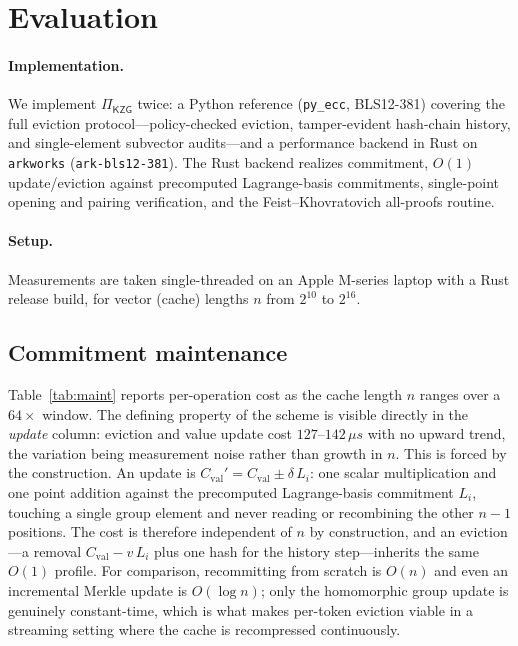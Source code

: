 \documentclass[version=submission]{iacrcc}
\theoremstyle{definition}
\newcommand{\Val}{\mathrm{val}}
\newcommand{\Cval}{C_{\Val}}
\begin{document}
\section{Evaluation}\label{sec:eval}

\paragraph{Implementation.}
We implement $\Pi_{\mathsf{KZG}}$ twice: a Python reference (\texttt{py\_ecc},
BLS12-381) covering the full eviction protocol---policy-checked eviction,
tamper-evident hash-chain history, and single-element subvector audits---and a
performance backend in Rust on \texttt{arkworks} (\texttt{ark-bls12-381}). The
Rust backend realizes commitment, $O(1)$ update/eviction against precomputed
Lagrange-basis commitments, single-point opening and pairing verification, and
the Feist--Khovratovich all-proofs routine.

\paragraph{Setup.}
Measurements are taken single-threaded on an Apple M-series laptop with a Rust
release build, for vector (cache) lengths $n$ from $2^{10}$ to $2^{16}$.

\subsection{Commitment maintenance}
Table~\ref{tab:maint} reports per-operation cost as the cache length $n$ ranges
over a $64\times$ window. The defining property of the scheme is visible directly
in the \emph{update} column: eviction and value update cost $127$--$142\,\mu s$
with no upward trend, the variation being measurement noise rather than growth in
$n$. This is forced by the construction. An update is
$\Cval'=\Cval\pm\delta\,L_i$: one scalar multiplication and one point addition
against the precomputed Lagrange-basis commitment $L_i$, touching a single group
element and never reading or recombining the other $n-1$ positions. The cost is
therefore independent of $n$ by construction, and an eviction---a removal
$\Cval-v\,L_i$ plus one hash for the history step---inherits the same $O(1)$
profile. For comparison, recommitting from scratch is $O(n)$ and even an
incremental Merkle update is $O(\log n)$; only the homomorphic group update is
genuinely constant-time, which is what makes per-token eviction viable in a
streaming setting where the cache is recompressed continuously.
\end{document}
